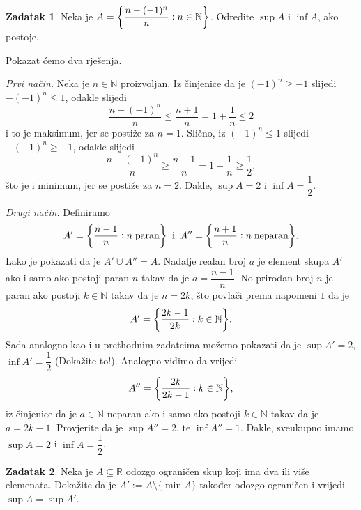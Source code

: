 \documentclass{book}
\let\originalleft\left
\let\originalright\right
\renewcommand{\left}{\mathopen{}\mathclose\bgroup\originalleft}
\renewcommand{\right}{\aftergroup\egroup\originalright}
\renewenvironment{proof}{%
    \vspace{-\parskip}\begin{oldproof}%
    }{%
    \end{oldproof}%
}
\theoremstyle{definition}
\theoremstyle{definition}
\newtheorem{exercise}{Zadatak}
\theoremstyle{remark}
\begin{document}
\begin{exercise}
Neka je $A=\left\{\dfrac{n-(-1)^n}{n} : n\in \mathbb{N}\right\}$. Odredite $\sup{A}$ i $\inf{A}$, ako postoje.
\end{exercise}
\begin{proof}[Rješenje]
Pokazat ćemo dva rješenja.

\textit{Prvi način.} Neka je $n\in \mathbb{N}$ proizvoljan. Iz činjenice da je $(-1)^n\geq -1$ slijedi $-(-1)^n\leq 1$, odakle slijedi
$$\dfrac{n-(-1)^n}{n}\leq \dfrac{n+1}{n}=1+\dfrac{1}{n}\leq 2$$
i to je maksimum, jer se postiže za $n=1$. Slično, iz $(-1)^n\leq 1$ slijedi $-(-1)^n\geq -1$, odakle slijedi
$$\dfrac{n-(-1)^n}{n}\geq \dfrac{n-1}{n}=1-\dfrac{1}{n}\geq \dfrac{1}{2},$$
što je i minimum, jer se postiže za $n=2$. Dakle, $\sup{A}=2$ i $\inf{A}=\dfrac{1}{2}$.

\textit{Drugi način.} Definiramo
$$A'=\left\{\dfrac{n-1}{n} : n \;\mathrm{paran}\right\}\;\;\text{i}\;\;A''=\left\{\dfrac{n+1}{n} : n \;\mathrm{neparan}\right\}.$$ Lako je pokazati da je $A'\cup A''=A$. Nadalje realan broj $a$ je element skupa $A'$ ako i samo ako postoji paran $n$ takav da je $a=\dfrac{n-1}{n}$. No prirodan broj $n$ je paran ako postoji $k\in \mathbb{N}$ takav da je $n=2k$, što povlači prema napomeni $1$ da je $$A'=\left\{\dfrac{2k-1}{2k} : k\in \mathbb{N}\right\}.$$ Sada analogno kao i u prethodnim zadatcima možemo pokazati da je $\sup{A'}=2$, $\inf{A'}=\dfrac{1}{2}$ (Dokažite to!). Analogno vidimo da vrijedi $$A''=\left\{\dfrac{2k}{2k-1} : k\in \mathbb{N}\right\},$$ iz činjenice da je $a\in \mathbb{N}$ neparan ako i samo ako postoji $k\in \mathbb{N}$ takav da je $a=2k-1$. Provjerite da je $\sup{A''}=2$, te $\inf{A''}=1$. Dakle, sveukupno imamo $\sup{A}=2$ i $\inf{A}=\dfrac{1}{2}$.
\end{proof}
\begin{exercise}
Neka je $A\subseteq \mathbb{R}$ odozgo ograničen skup koji ima dva ili više elemenata. Dokažite da je $A':=A\setminus \{\min{A}\}$ također odozgo ograničen i vrijedi $\sup{A}=\sup{A'}$.
\end{exercise}
\end{document}
